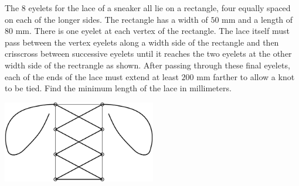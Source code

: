 The $8$ eyelets for the lace of a sneaker all lie on a rectangle, four equally spaced on each of the longer sides. The rectangle has a width of $50$ mm and a length of $80$ mm. There is one eyelet at each vertex of the rectangle. The lace itself must pass between the vertex eyelets along a width side of the rectangle and then crisscross between successive eyelets until it reaches the two eyelets at the other width side of the rectrangle as shown. After passing through these final eyelets, each of the ends of the lace must extend at least $200$ mm farther to allow a knot to be tied. Find the minimum length of the lace in millimeters.

\begin{center}
\includegraphics[width = 67.0mm]{img/fig0.png}
\end{center}